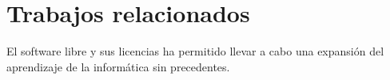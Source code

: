 
\section{Trabajos relacionados} %
El software libre y sus licencias \cite{gplv3} ha permitido llevar a cabo una expansión del aprendizaje de la informática sin precedentes.  %
